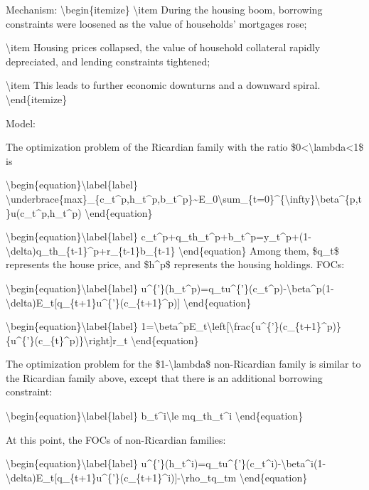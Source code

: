 \documentclass[10pt,math=newtx,citestyle=gb7714-2015,bibstyle=gb7714-2015]{elegantbook}
\begin{document}
	Mechanism:
	\textbackslash{}begin\{itemize\}
	\textbackslash{}item During the housing boom, borrowing constraints were loosened as the value of households' mortgages rose;
	
	\textbackslash{}item Housing prices collapsed, the value of household collateral rapidly depreciated, and lending constraints tightened;
	
	\textbackslash{}item This leads to further economic downturns and a downward spiral.
	\textbackslash{}end\{itemize\}
	
	
	Model:
	
	The optimization problem of the Ricardian family with the ratio \$0<\textbackslash{}lambda<1\$ is
	
	\textbackslash{}begin\{equation\}\textbackslash{}label\{label\}
	\textbackslash{}underbrace\{max\}\_\{c\_t\^{}p,h\_t\^{}p,b\_t\^{}p\}\~{}E\_0\textbackslash{}sum\_\{t=0\}\^{}\{\textbackslash{}infty\}\textbackslash{}beta\^{}\{p,t\}u(c\_t\^{}p,h\_t\^{}p)
	\textbackslash{}end\{equation\}
	
	\textbackslash{}begin\{equation\}\textbackslash{}label\{label\}
	c\_t\^{}p+q\_th\_t\^{}p+b\_t\^{}p=y\_t\^{}p+(1-\textbackslash{}delta)q\_th\_\{t-1\}\^{}p+r\_\{t-1\}b\_\{t-1\}
	\textbackslash{}end\{equation\}
	Among them, \$q\_t\$ represents the house price, and \$h\^{}p\$ represents the housing holdings.
	FOCs:
	
	\textbackslash{}begin\{equation\}\textbackslash{}label\{label\}
	u\^{}\{'\}(h\_t\^{}p)=q\_tu\^{}\{'\}(c\_t\^{}p)-\textbackslash{}beta\^{}p(1-\textbackslash{}delta)E\_t[q\_\{t+1\}u\^{}\{'\}(c\_\{t+1\}\^{}p)]
	\textbackslash{}end\{equation\}
	
	\textbackslash{}begin\{equation\}\textbackslash{}label\{label\}
	1=\textbackslash{}beta\^{}pE\_t\textbackslash{}left[\textbackslash{}frac\{u\^{}\{'\}(c\_\{t+1\}\^{}p)\}\{u\^{}\{'\}(c\_\{t\}\^{}p)\}\textbackslash{}right]r\_t
	\textbackslash{}end\{equation\}
	
	The optimization problem for the \$1-\textbackslash{}lambda\$ non-Ricardian family is similar to the Ricardian family above, except that there is an additional borrowing constraint:
	
	\textbackslash{}begin\{equation\}\textbackslash{}label\{label\}
	b\_t\^{}i\textbackslash{}le mq\_th\_t\^{}i
	\textbackslash{}end\{equation\}
	
	At this point, the FOCs of non-Ricardian families:
	
	\textbackslash{}begin\{equation\}\textbackslash{}label\{label\}
	u\^{}\{'\}(h\_t\^{}i)=q\_tu\^{}\{'\}(c\_t\^{}i)-\textbackslash{}beta\^{}i(1-\textbackslash{}delta)E\_t[q\_\{t+1\}u\^{}\{'\}(c\_\{t+1\}\^{}i)]-\textbackslash{}rho\_tq\_tm
	\textbackslash{}end\{equation\}
	
\end{document}
